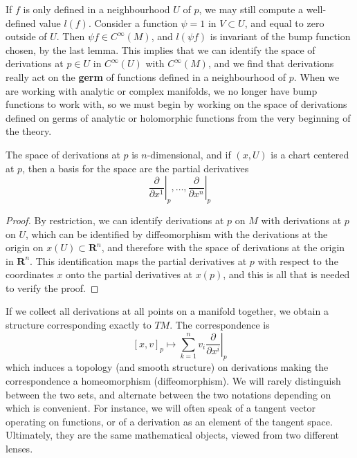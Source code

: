 If $f$ is only defined in a neighbourhood $U$ of $p$, we may still compute a well-defined value $l(f)$. Consider a function $\psi = 1$ in $V \subset U$, and equal to zero outside of $U$. Then $\psi f \in C^\infty(M)$, and $l(\psi f)$ is invariant of the bump function chosen, by the last lemma. This implies that we can identify the space of derivations at $p \in U$ in $C^\infty(U)$ with $C^\infty(M)$, and we find that derivations really act on the {\bf germ} of functions defined in a neighbourhood of $p$. When we are working with analytic or complex manifolds, we no longer have bump functions to work with, so we must begin by working on the space of derivations defined on germs of analytic or holomorphic functions from the very beginning of the theory.

\begin{theorem}
    The space of derivations at $p$ is $n$-dimensional, and if $(x,U)$ is a chart centered at $p$, then a basis for the space are the partial derivatives
    \[ \left.\frac{\partial}{\partial x^1}\right|_p, \dots, \left.\frac{\partial}{\partial x^n}\right|_p \]
\end{theorem}
\begin{proof}
    By restriction, we can identify derivations at $p$ on $M$ with derivations at $p$ on $U$, which can be identified by diffeomorphism with the derivations at the origin on $x(U) \subset \mathbf{R}^n$, and therefore with the space of derivations at the origin in $\mathbf{R}^n$. This identification maps the partial derivatives at $p$ with respect to the coordinates $x$ onto the partial derivatives at $x(p)$, and this is all that is needed to verify the proof.
\end{proof}

If we collect all derivations at all points on a manifold together, we obtain a structure corresponding exactly to $TM$. The correspondence is
%
\[ [x,v]_p \mapsto \sum_{k = 1}^n v_i \left.\frac{\partial}{\partial x^i}\right|_p \]
%
which induces a topology (and smooth structure) on derivations making the correspondence a homeomorphism (diffeomorphism). We will rarely distinguish between the two sets, and alternate between the two notations depending on which is convenient. For instance, we will often speak of a tangent vector operating on functions, or of a derivation as an element of the tangent space. Ultimately, they are the same mathematical objects, viewed from two different lenses.

